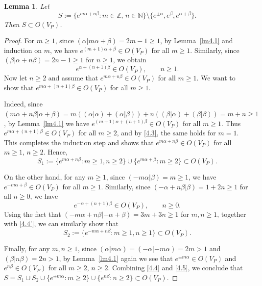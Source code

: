 \documentclass[12pt,a4paper,reqno]{amsart}
\numberwithin{equation}{section}
\numberwithin{equation}{section}
\newtheorem{lm}[thm]{Lemma}
\theoremstyle{definition}
\begin{document}
	\begin{lm}\label{lm4.2}
		Let 
		\[
		S:=\{e^{m\alpha+n\beta}:m\in\mathbb{Z},\,n\in\mathbb{N}\}\setminus\{e^{\pm\alpha},e^{\beta},e^{\alpha+\beta}\}.
		\]
		Then $S\subset O(V_P)$.
	\end{lm}
	\begin{proof}
		For $m\geq 1$, since $(\alpha|m\alpha+\beta)=2m-1\geq 1$, by Lemma~\ref{lm4.1} and induction on $m$, we have $e^{(m+1)\alpha+\beta}\in O(V_P)$ for all $m\geq 1$. Similarly, since $(\beta|\alpha+n\beta)=2n-1\geq 1$ for $n\geq 1$, we obtain
		\begin{equation}\label{4.3}
			e^{\alpha+(n+1)\beta}\in O(V_P),\qquad n\geq 1.
		\end{equation}
		Now let $n\geq 2$ and assume that $e^{m\alpha+n\beta}\in O(V_P)$ for all $m\geq 1$. We want to show that $e^{m\alpha+(n+1)\beta}\in O(V_P)$ for all $m\geq 1$.
		
		Indeed, since $(m\alpha+n\beta|\alpha+\beta)=m((\alpha|\alpha)+(\alpha|\beta))+n((\beta|\alpha)+(\beta|\beta))=m+n\geq 1$, by Lemma~\ref{lm4.1} we have $e^{(m+1)\alpha+(n+1)\beta}\in O(V_P)$ for all $m\geq 1$. Thus $e^{m\alpha+(n+1)\beta}\in O(V_P)$ for all $m\geq 2$, and by \eqref{4.3}, the same holds for $m=1$. This completes the induction step and shows that $e^{m\alpha+n\beta}\in O(V_P)$ for all $m\geq 1$, $n\geq 2$. Hence,
		\begin{equation}\label{4.4}
			S_{1}:=\{e^{m\alpha+n\beta}:m\geq 1,n\geq 2\}\cup\{e^{m\alpha+\beta}:m\geq 2\}\subset O(V_P).
		\end{equation}
		
		On the other hand, for any $m\geq 1$, since $(-m\alpha|\beta)=m\geq 1$, we have $e^{-m\alpha+\beta}\in O(V_P)$ for all $m\geq 1$. Similarly, since $(-\alpha+n\beta|\beta)=1+2n\geq 1$ for all $n\geq 0$, we have 
		\begin{equation}\label{4.4'}
			e^{-\alpha+(n+1)\beta}\in O(V_P),\qquad n\geq 0. 
		\end{equation}
		Using the fact that $(-m\alpha+n\beta|-\alpha+\beta)=3m+3n\geq 1$ for $m,n\geq 1$, together with \eqref{4.4'}, we can similarly show that
		\begin{equation}\label{4.5}
			S_2:=\{e^{-m\alpha+n\beta}: m\geq 1, n\geq 1\}\subset O(V_P).
		\end{equation}
		
		Finally, for any $m,n\geq 1$, since $(\alpha|m\alpha)=(-\alpha|-m\alpha)=2m>1$ and $(\beta|n\beta)=2n>1$, by Lemma~\ref{lm4.1} again we see that $e^{\pm m\alpha}\in O(V_P)$ and $e^{n\beta}\in O(V_P)$ for all $m\geq 2$, $n\geq 2$. Combining \eqref{4.4} and \eqref{4.5}, we conclude that
		$	S=S_1\cup S_2\cup\{e^{\pm m\alpha}:m\geq 2\}\cup\{e^{n\beta}:n\geq 2\}\subset O(V_P).
		$
	\end{proof}
	
\end{document}

